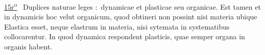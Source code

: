 %
\frenchspacing%
\vspace{8mm}%
\normalsize%
\pstart%
\noindent%
\lbrack%
\href{\Scan{LH_04_01_02a_015r}}%
{15\:r\textsuperscript{o}}%
\rbrack\
Duplices naturae leges%
%
%
\lbrack:\rbrack\
dynamicae%
et plasticae%
seu organicae.%
Est tamen et in dynamicis%
hoc velut organicum,%
quod obtineri non possint
nisi materia ubique Elastica esset,%
neque elastrum%
in materia,%
nisi sytemata in systematibus collocarentur.%
In quod dynamica%
respondent plasticis,%
quae semper organa in organis habent.%
\pend%
%
\frenchspacing%
\normalsize%
